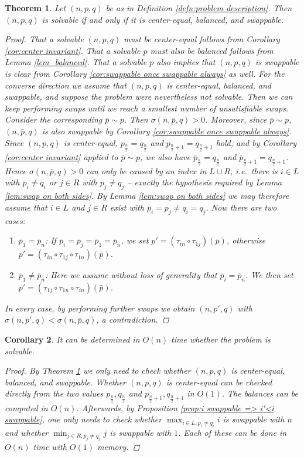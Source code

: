 \documentclass[12pt]{article}
\newtheorem{thm}{Theorem} %
\newtheorem{cor}[thm]{Corollary}
\begin{document}
\begin{thm}
Let $(n, p, q)$ be as in Definition \ref{defn:problem description}. Then $(n, p, q)$ is solvable if and only if it is center-equal, balanced, and swappable.
\begin{proof}
That a solvable $(n,p,q)$ must be center-equal follows from Corollary \ref{cor:center invariant}. That a solvable $p$ must also be balanced follows from Lemma \ref{lem_balanced}. That a solvable $p$ also implies that $(n, p, q)$ is swappable is clear from Corollary \ref{cor:swappable once swappable always} as well. For the converse direction we assume that $(n,p,q)$ is center-equal, balanced, and swappable, and suppose the problem were nevertheless not solvable. Then we can keep performing swaps until we reach a smallest number of unsatisfiable swaps. Consider the corresponding $\bar{p}\sim p$. Then $\sigma(n, \bar{p}, q)>0$. Moreover, since $\bar{p}\sim p$, $(n, \bar{p}, q)$ is also swappable by Corollary \ref{cor:swappable once swappable always}.
Since $(n,p,q)$ is center-equal, $p_{\frac{n}{2}}=q_{\frac{n}{2}}$ and $p_{\frac{n}{2}+1}=q_{\frac{n}{2}+1}$ hold, and by Corollary \ref{cor:center invariant} applied to $\bar p\sim p$, we also have $\bar p_{\frac{n}{2}}=q_{\frac{n}{2}}$ and $\bar p_{\frac{n}{2}+1}=q_{\frac{n}{2}+1}$. Hence $\sigma(n,\bar p, q)>0$ can only be caused by an index in $L\cup R$, i.e.\ there is $i\in L$ with $\bar p_i\neq q_i$ or $j\in R$ with $\bar p_j\neq q_j$ -- exactly the hypothesis required by Lemma \ref{lem:swap on both sides}.
By Lemma \ref{lem:swap on both sides} we may therefore assume that $i\in L$ and $j\in R$ exist with $p_i=p_j\neq q_i=q_j$.
Now there are two cases:
\begin{enumerate}
 \item $\bar{p}_1 = \bar{p}_n$: If $\bar{p}_i=\bar{p}_j=\bar{p}_1=\bar{p}_n$, we set $p'=(\tau_{in}\circ\tau_{1j})(\bar{p})$, otherwise $p'=(\tau_{in}\circ\tau_{1j}\circ\tau_{1n})(\bar{p})$.
 \item $\bar{p}_1 \neq \bar{p}_n$: Here we assume without loss of generality that $\bar{p}_i=\bar{p}_n$. We then set $p'=(\tau_{1j}\circ\tau_{1n}\circ\tau_{in})(\bar{p})$.
\end{enumerate}
In every case, by performing further swaps we obtain $(n, p', q)$ with $\sigma(n, p', q)<\sigma(n, \bar{p}, q)$, a contradiction.
\end{proof}
\label{thm}
\end{thm}

\begin{cor}
It can be determined in $O(n)$ time whether the problem is solvable.
\begin{proof}
By Theorem \ref{thm} we only need to check whether $(n, p, q)$ is center-equal, balanced, and swappable.
Whether $(n,p,q)$ is center-equal can be checked directly from the two values $p_{\frac{n}{2}}, q_{\frac{n}{2}}$ and $p_{\frac{n}{2}+1}, q_{\frac{n}{2}+1}$ in $O(1)$. The balances can be computed in $O(n)$. Afterwards, by Proposition \ref{prop:i swappable => i'<i swappable}, one only needs to check whether $\max_{i\in L, p_i\neq q_i} i$ is swappable with $n$ and whether $\min_{j\in R, p_j\neq q_j} j$ is swappable with $1$. Each of these can be done in $O(n)$ time with $O(1)$ memory.
\end{proof}
\end{cor}
\end{document}

